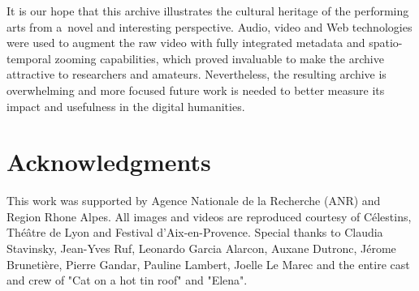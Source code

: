 \documentclass[conference]{IEEEtran}
\newcommand{\todo}[1]{\noindent\textcolor{red}{{\bf \{ToDo} #1{\bf \}}}}
\begin{document}
It is our hope that this archive illustrates the cultural heritage of the performing arts from a~novel and 
interesting perspective. Audio, video and Web technologies were used to augment
the raw video with fully integrated metadata and spatio-temporal zooming capabilities,
which proved invaluable to make the archive attractive to researchers and amateurs.
Nevertheless, the resulting archive is overwhelming and more focused future work is needed to 
better measure its impact and usefulness in the digital humanities. 





\section*{Acknowledgments}

This work was supported by Agence Nationale de la Recherche (ANR) and Region Rhone Alpes. All images and videos are reproduced courtesy of C\'elestins, Th\'e\^atre de Lyon and Festival d'Aix-en-Provence.  Special thanks to Claudia Stavinsky, Jean-Yves Ruf, Leonardo Garcia Alarcon,
Auxane Dutronc, J\'erome Bruneti\`ere, Pierre Gandar, Pauline Lambert, Joelle Le Marec  and the entire cast and crew  of "Cat on a hot tin roof" and "Elena". 










\end{document}
